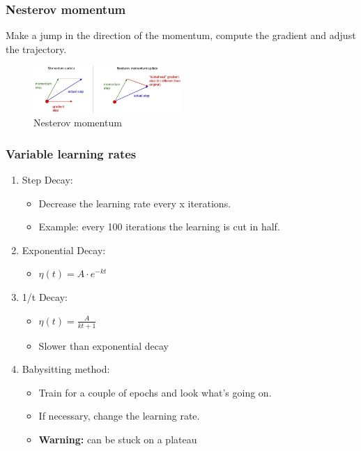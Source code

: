 \documentclass{article}
\begin{document}
\subsubsection{Nesterov momentum}

Make a jump in the direction of the momentum, compute the gradient and adjust the
trajectory.

\begin{figure}[H]
    \centering
    \includegraphics[width=0.5\textwidth]{img/nesterov-momentum.png}
    \caption{Nesterov momentum}
\end{figure}

\subsubsection{Variable learning rates}

\begin{enumerate}
    \item Step Decay:
    \begin{itemize}
        \item Decrease the learning rate every x iterations. 
        \item Example: every 100 iterations the learning is cut in half.
    \end{itemize}
    \item Exponential Decay:
    \begin{itemize}
        \item $\eta(t) = A\cdot e^{-kt}$
    \end{itemize}
    \item 1/t Decay:
    \begin{itemize}
        \item $\eta(t) = \frac{A}{kt + 1}$        
        \item Slower than exponential decay
    \end{itemize}
    \item Babysitting method:
    \begin{itemize}
        \item Train for a couple of epochs and look what's going on. 
        \item If necessary, change the learning rate.
        \item \textbf{Warning:} can be stuck on a plateau
    \end{itemize}
\end{enumerate}
\end{document}
